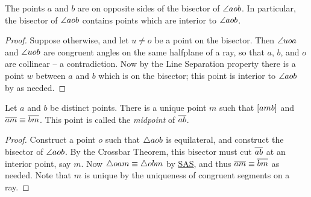 \begin{cor}
The points \(a\) and \(b\) are on opposite sides of the bisector of \(\angle{aob}\).
In particular, the bisector of \(\angle{aob}\) contains points which are interior to \(\angle{aob}\).
\end{cor}

\begin{proof}
Suppose otherwise, and let \(u \neq o\) be a point on the bisector.
Then \(\angle{uoa}\) and \(\angle{uob}\) are congruent angles on the same halfplane of a ray, so that \(a\), \(b\), and \(o\) are collinear -- a contradiction.
Now by the Line Separation property there is a point \(w\) between \(a\) and \(b\) which is on the bisector; this point is interior to \(\angle{aob}\) by  as needed.
\end{proof}

\begin{construct}
Let \(a\) and \(b\) be distinct points.
There is a unique point \(m\) such that \([ a m b ]\) and \(\overline{am} \equiv \overline{bm}\).
This point is called the \emph{midpoint} of \(\overline{ab}\).
\end{construct}

\begin{proof}
Construct a point \(o\) such that \(\bigtriangleup{aob}\) is equilateral, and construct the bisector of \(\angle{aob}\).
By the Crossbar Theorem, this bisector must cut \(\overline{ab}\) at an interior point, say \(m\).
Now \(\bigtriangleup{oam} \equiv \bigtriangleup{obm}\) by \hyperref[prop:sas-theorem]{SAS}, and thus \(\overline{am} \equiv \overline{bm}\) as needed.
Note that \(m\) is unique by the uniqueness of congruent segments on a ray.
\end{proof}
